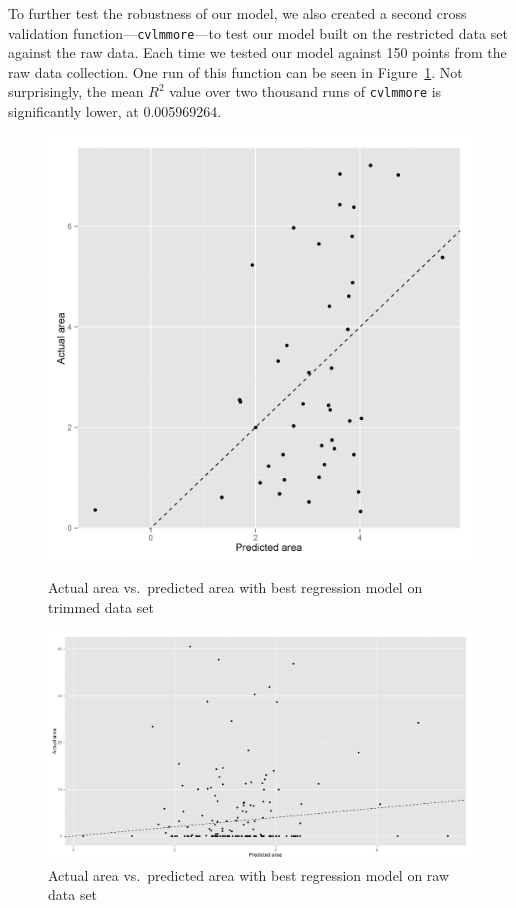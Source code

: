 \documentclass{article}
\begin{document}
To further test the robustness of our model, we also created a second cross
validation function---\verb=cvlmmore=---to test our model built on the
restricted data set against the raw data. Each time we tested our model against
150 points from the raw data collection. One run of this function can be seen
in Figure~\ref{fig:linreggood2}. Not surprisingly, the mean $R^2$ value over
two thousand runs of \verb=cvlmmore= is significantly lower, at 0.005969264.

\begin{figure}
  \begin{minipage}[b]{0.45\linewidth}
  \centering
  \includegraphics[width=\textwidth]{goodfiresowndat.jpg}
  \caption{Actual area vs.\ predicted area with best regression model on
  trimmed data set}
  \label{fig:linreggood1}
\end{minipage}
\hspace{0.5cm}
  \begin{minipage}[b]{0.45\linewidth}
  \centering
  \includegraphics[width=\textwidth]{goodfiresalldat.jpg}
  \caption{Actual area vs.\ predicted area with best regression model on raw
  data set}
  \label{fig:linreggood2}
\end{minipage}
\end{figure}
\end{document}
